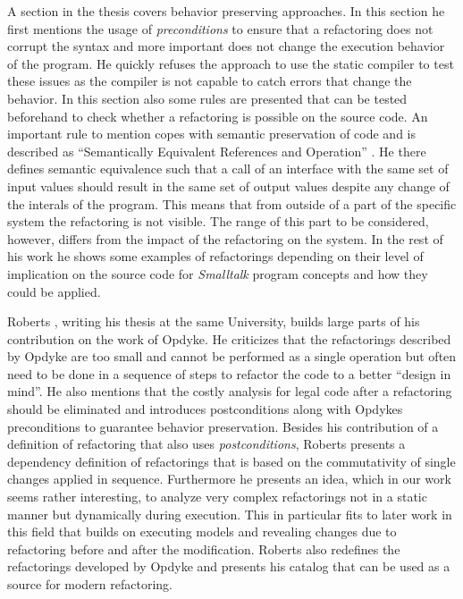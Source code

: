 \documentclass{llncs}
\begin{document}
A section in the thesis covers behavior preserving approaches. In this section he first mentions the usage of
\textit{preconditions} to ensure that a refactoring does not corrupt the syntax and more important does not change the
execution behavior of the program. He quickly refuses the approach to use the static compiler to test these issues as
the compiler is not capable to catch errors that change the behavior. In this section also some rules are presented that
can be tested beforehand to check whether a refactoring is possible on the source code. An important rule to mention copes with
semantic preservation of code and is described as ``Semantically Equivalent References and Operation'' \cite{mast:REFOOF}. He there defines
semantic equivalence such that a call of an interface with the same set of input values should result in the same set of
output values despite any change of the interals of the program. This means that from outside of a part of the specific system
the refactoring is not visible. The range of this part to be considered, however, differs from the impact of the refactoring on
the system. In the rest of his work he shows some examples of refactorings depending on their level of implication on
the source code for \textit{Smalltalk} program concepts and how they could be applied.

Roberts \cite{rob99}, writing his thesis at the same University, builds large parts of his contribution on the work of
Opdyke. He criticizes that the refactorings described by Opdyke are too small and cannot be performed as a single
operation but often need to be done in a sequence of steps to refactor the code to a better ``design in mind''.  He also mentions
that the costly analysis for legal code after a refactoring should be eliminated and introduces postconditions along
with Opdykes preconditions to guarantee behavior preservation. Besides his contribution of a definition of refactoring
that also uses \textit{postconditions}, Roberts presents a dependency definition of refactorings that is based on the
commutativity of single changes applied in sequence. Furthermore he presents an idea, which in our work seems rather interesting,
to analyze very complex refactorings not in a static manner but dynamically during execution. This in
particular fits to later work in this field that builds on executing models and revealing changes due to refactoring before
and after the modification. Roberts also redefines the refactorings developed by Opdyke and presents his catalog that
can be used as a source for modern refactoring.
\end{document}
